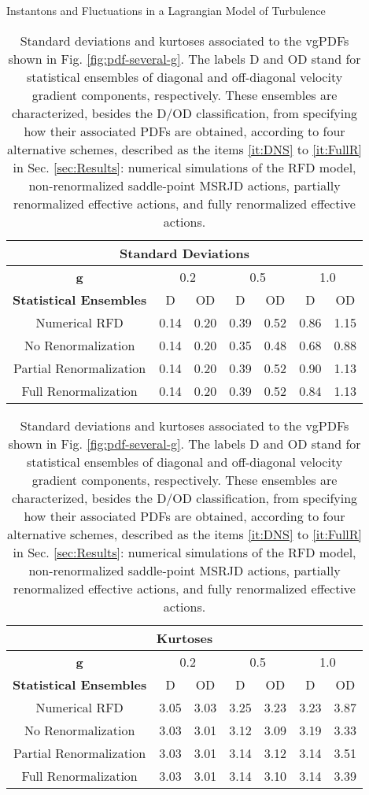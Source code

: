 \begin{chapter}{Instantons and Fluctuations in a Lagrangian Model of Turbulence}
\begin{table}[ht]
\centering
\begin{tabular}{|c|c|c|c|c|c|c|}
\hline \multicolumn{7}{|c|}{\textbf{Standard Deviations}}
\\ \hline
\textbf{g}  & \multicolumn{2}{c|}{0.2} & \multicolumn{2}{c|}{0.5} & \multicolumn{2}{c|}{1.0} \\ \hline
 {\textbf{Statistical Ensembles}} & D & OD & D & OD & D & OD \\ \hline
Numerical RFD & 0.14 & 0.20 & 0.39 & 0.52 & 0.86 & 1.15 \\ \hline
No Renormalization & 0.14 & 0.20 & 0.35 & 0.48 & 0.68 & 0.88 \\ \hline
Partial Renormalization & 0.14 & 0.20 & 0.39 & 0.52 & 0.90 & 1.13 \\ \hline
Full Renormalization & 0.14 & 0.20 & 0.39 & 0.52 & 0.84 & 1.13 \\ \hline
\end{tabular}
\begin{tabular}{|c|c|c|c|c|c|c|}
\hline \multicolumn{7}{|c|}{\textbf{Kurtoses}}
\\ \hline
\textbf{g}  & \multicolumn{2}{c|}{0.2} & \multicolumn{2}{c|}{0.5} & \multicolumn{2}{c|}{1.0} 
\\ \hline
 {\textbf{Statistical Ensembles}} & D & OD & D & OD & D & OD\\ \hline
Numerical RFD & 3.05 & 3.03 & 3.25 & 3.23 & 3.23 & 3.87 \\ \hline
No Renormalization & 3.03 & 3.01 & 3.12 & 3.09 & 3.19 & 3.33 \\ \hline
Partial Renormalization & 3.03 & 3.01 & 3.14 & 3.12 & 3.14 & 3.51 \\ \hline
Full Renormalization & 3.03 & 3.01 & 3.14 & 3.10 & 3.14 & 3.39 \\ \hline
\end{tabular}
\caption{Standard deviations and kurtoses associated to the vgPDFs shown in Fig. \ref{fig:pdf-several-g}. The labels D and OD stand for statistical ensembles of diagonal and off-diagonal velocity gradient components, respectively. These ensembles are characterized, besides the D/OD classification, from specifying how their associated PDFs are obtained,
according to four alternative schemes, described as the items
\ref{it:DNS} to \ref{it:FullR} in Sec. \ref{sec:Results}:
numerical simulations of the RFD model, non-renormalized saddle-point MSRJD actions, partially renormalized effective actions, and fully renormalized effective actions.
}
\label{tab}
\end{table}


\end{chapter}
